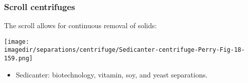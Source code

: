 % 
% 
% 
% 
% 
% 
% 
% 
% 
% 

\begin{frame}\frametitle{Scroll centrifuges}
	The scroll allows for continuous removal of solids:
	\begin{center}
		\texttt{[image: \\imagedir/separations/centrifuge/Sedicanter-centrifuge-Perry-Fig-18-159.png]}
	\end{center}
	\begin{itemize}
		\item	Sedicanter: biotechnology, vitamin, soy, and yeast separations.
	\end{itemize}
\end{frame}

